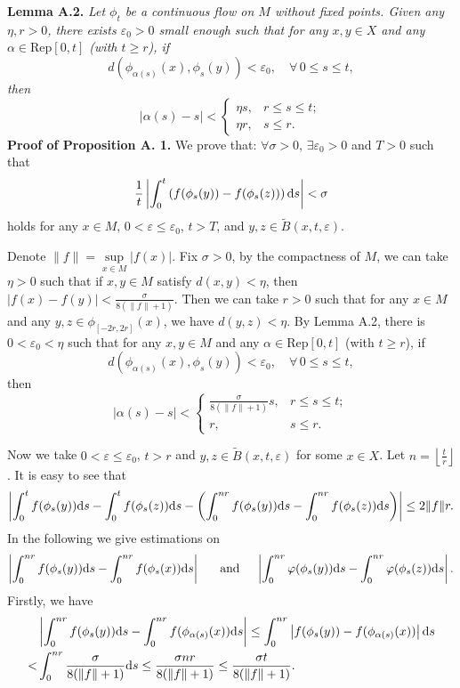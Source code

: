 \documentclass[10pt]{article}
\newtheorem*{Theorem A}{Theorem A}
\begin{document}
\noindent\textbf{Lemma A.2. } {\it Let $\phi_t$ be a continuous flow on $M$ without fixed points. Given any \( \eta, r > 0 \), there exists \( \varepsilon_0 > 0 \) small enough such that for any \( x, y \in X \) and any \( \alpha \in \text{Rep}[0, t] \) (with \( t \geq r \)), if
\[
d(\phi_{\alpha(s)}(x), \phi_s(y)) < \varepsilon_0, \quad \forall \,0 \leq s \leq t,
\]
then
\[
|\alpha(s) - s| <
\begin{cases}
\eta s, &  r\leq s \leq t; \\
\eta r, &  s \leq r.
\end{cases}
\]
}
\bigskip
\noindent\textbf{Proof of Proposition A. 1. }
We prove that:  \(\forall \sigma > 0 \),  \( \exists\varepsilon_0 > 0 \) and \( T > 0 \) such that
$$\frac{1}{t} \left| \int_0^t \left( f(\phi_s (y)) - f(\phi_s (z)) \right) {\rm d}s \right| < \sigma$$
holds for any \( x \in M\), \( 0 < \varepsilon \leq \varepsilon_0 \), \( t > T \), and \( y, z \in \tilde{B}(x, t, \varepsilon) \).

Denote \( \|f\| = \sup\limits_{x \in M} |f(x)| \). Fix \( \sigma > 0 \), by the compactness of \( M\), we can take \( \eta > 0 \) such that if \( x, y \in M \) satisfy \( d(x, y) < \eta \), then \( |f(x) - f(y)| < \frac{\sigma}{8(\|f\| + 1)} \). Then we can take \( r > 0 \) such that for any \( x \in M \) and any \( y, z \in \phi_{[-2r, 2r]}(x) \), we have \( d(y, z) < \eta \). By Lemma A.2, there is \( 0 < \varepsilon_0 < \eta \) such that for any \( x, y \in M\) and any \( \alpha \in \text{Rep}[0, t] \) (with \( t \geq r \)), if
\[
d(\phi_{\alpha(s)}(x), \phi_s(y)) < \varepsilon_0, \quad \forall \,0 \leq s \leq t,
\]
then
\[
|\alpha(s) - s| <
\begin{cases}
\frac{\sigma}{8(\|f\| + 1)} s, & r\leq s \leq t ; \\
r, &  s \leq r.
\end{cases}
\]

Now we take \( 0 < \varepsilon \leq \varepsilon_0 \), \( t > r \) and \( y, z \in \tilde{B}(x, t, \varepsilon) \) for some \( x \in X \). Let \( n = \left\lfloor \frac{t}{r} \right\rfloor \). It is easy to see that
\[
\left| \int_0^t f(\phi_s (y)) {\rm d}s - \int_0^t f(\phi_s (z)) {\rm d}s - \left( \int_0^{nr} f(\phi_s (y)) {\rm d}s - \int_0^{nr} f(\phi_s (z)) {\rm d}s \right) \right| \leq 2 \|f\| r.
\]
In the following we give estimations on
\[ \left| \int_0^{nr} f(\phi_s (y)) {\rm d}s - \int_0^{nr} f(\phi_s (x)) {\rm d}s \right| \text{\ \ \ \ \ and\ \ \ \ } \left| \int_0^{nr} \varphi(\phi_s (y)) {\rm d}s - \int_0^{nr} \varphi(\phi_s (z)) {\rm d}s \right|  .\]  Firstly, we have
\[
\begin{aligned}
&\left| \int_0^{nr} f(\phi_s(y)) {\rm d}s - \int_0^{nr} f(\phi_{\alpha(s)}(x)) {\rm d}s \right| \leq \int_0^{nr} \left| f(\phi_s(y)) - f(\phi_{\alpha(s)}(x)) \right| {\rm d}s \\
<& \int_0^{nr} \frac{\sigma}{8(\|f\| + 1)} {\rm d}s \leq \frac{\sigma nr}{8(\|f\| + 1)} \leq \frac{\sigma t}{8(\|f\| + 1)}.
\end{aligned}
\]
\end{document}
